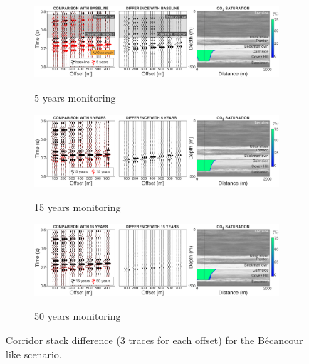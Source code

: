 \begin{figure}[!ht]
        \centering
        \begin{subfigure}[b]{0.95\textwidth}
                \caption{5 years monitoring}
                \includegraphics[width=\textwidth]{fig/seism_bec_new_a.pdf}
                \label{fig:seism_bec_a}
        \end{subfigure}%

        \begin{subfigure}[b]{.95\textwidth}
                \caption{15 years monitoring}
                \includegraphics[width=\textwidth]{fig/seism_bec_new_b.pdf}
                \label{fig:seism_bec_b}
        \end{subfigure}

        \begin{subfigure}[b]{.95\textwidth}
                \caption{50 years monitoring}
                \includegraphics[width=\textwidth]{fig/seism_bec_new_c.pdf}
                \label{fig:seism_bec_c}
        \end{subfigure}

        \caption{Corridor stack difference (3 traces for each offset) for the
B\'e\-can\-cour like scenario.}
        \label{fig:seismbec}
\end{figure}
